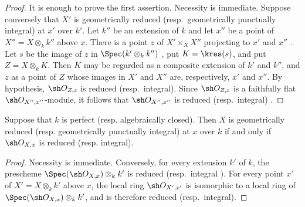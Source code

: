 \begin{proof}
It is enough to prove the first assertion.
Necessity is immediate.
Suppose conversely that $X'$ is geometrically reduced
(resp.\ geometrically punctually integral) at $x'$ over $k'$.
Let $k''$ be an extension of $k$ and let $x''$ be a point of
$X''=X\otimes_k k''$ above $x$.
There is a point $z$ of $X'\times_X X''$ projecting to $x'$ and $x''$
.
Let $s$ be the image of $z$ in
$\Spec(k'\otimes_k k'')$ , put
$K=\kres(s)$, and put $Z=X\otimes_kK$.
Then $K$ may be regarded as a composite extension of $k'$ and $k''$,
and $z$ as a point of $Z$ whose images in $X'$ and $X''$ are,
respectively, $x'$ and $x''$.
By hypothesis, $\sh O_{Z,z}$ is reduced (resp.\ integral).
Since $\sh O_{Z,z}$ is a faithfully flat
$\sh O_{X'',x''}$-module, it follows that $\sh O_{X'',x''}$ is
reduced (resp.\ integral) .
\end{proof}

\begin{corollary}[4.6.11]
\label{IV.4.6.11}
Suppose that $k$ is perfect \textup{(resp.} algebraically closed).
Then $X$ is geometrically reduced
\textup{(resp.} geometrically punctually integral) at $x$ over $k$ if and
only if $\sh O_{X,x}$ is reduced \textup{(resp.} integral).
\end{corollary}

\begin{proof}
Necessity is immediate.
Conversely, for every extension $k'$ of $k$, the prescheme
$\Spec(\sh O_{X,x})\otimes_k k'$ is reduced
 (resp.\ integral ).
For every point $x'$ of $X'=X\otimes_k k'$ above $x$, the local ring
$\sh O_{X',x'}$ is isomorphic to a local ring of
$\Spec(\sh O_{X,x})\otimes_k k'$, and is therefore reduced
(resp.\ integral).
\end{proof}

